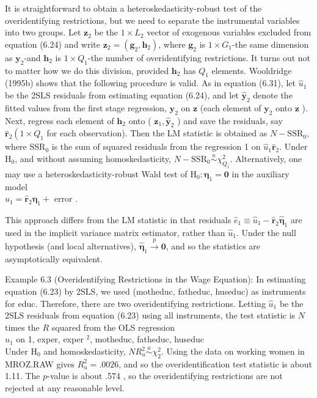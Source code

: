 \documentclass[10pt]{article}
\begin{document}
It is straightforward to obtain a heteroskedasticity-robust test of the overidentifying restrictions, but we need to separate the instrumental variables into two groups. Let $\mathbf{z}_{2}$ be the $1 \times L_{2}$ vector of exogenous variables excluded from equation (6.24) and write $\mathbf{z}_{2}=\left(\mathbf{g}_{2}, \mathbf{h}_{2}\right)$, where $\mathbf{g}_{2}$ is $1 \times G_{1}$-the same dimension as $\mathbf{y}_{2}$-and $\mathbf{h}_{2}$ is $1 \times Q_{1}$-the number of overidentifying restrictions. It turns out not to matter how we do this division, provided $\mathbf{h}_{2}$ has $Q_{1}$ elements. Wooldridge (1995b) shows that the following procedure is valid. As in equation (6.31), let $\hat{u}_{1}$ be the 2SLS residuals from estimating equation (6.24), and let $\hat{\mathbf{y}}_{2}$ denote the fitted values from the first stage regression, $\mathbf{y}_{2}$ on $\mathbf{z}$ (each element of $\mathbf{y}_{2}$ onto $\mathbf{z}$ ). Next, regress each element of $\mathbf{h}_{2}$ onto ( $\mathbf{z}_{1}, \hat{\mathbf{y}}_{2}$ ) and save the residuals, say $\hat{\mathbf{r}}_{2}\left(1 \times Q_{1}\right.$ for each observation). Then the LM statistic is obtained as $N-\mathrm{SSR}_{0}$, where $\mathrm{SSR}_{0}$ is the sum of squared residuals from the regression 1 on $\hat{u}_{1} \hat{\mathbf{r}}_{2}$. Under $\mathrm{H}_{0}$, and without assuming homoskedasticity, $N-\mathrm{SSR}_{0} \stackrel{a}{\sim} \chi_{Q_{1}}^{2}$. Alternatively, one may use a heteroskedasticity-robust Wald test of $\mathrm{H}_{0}: \boldsymbol{\eta}_{1}=\mathbf{0}$ in the auxiliary model\\
$\hat{u}_{1}=\hat{\mathbf{r}}_{2} \boldsymbol{\eta}_{1}+$ error .

This approach differs from the LM statistic in that residuals $\hat{e}_{1} \equiv \hat{u}_{1}-\hat{\mathbf{r}}_{2} \hat{\boldsymbol{\eta}}_{1}$ are used in the implicit variance matrix estimator, rather than $\hat{u}_{1}$. Under the null hypothesis (and local alternatives), $\hat{\boldsymbol{\eta}}_{1} \xrightarrow{p} \mathbf{0}$, and so the statistics are asymptotically equivalent.

Example 6.3 (Overidentifying Restrictions in the Wage Equation): In estimating equation (6.23) by 2SLS, we used (motheduc, fatheduc, huseduc) as instruments for educ. Therefore, there are two overidentifying restrictions. Letting $\hat{u}_{1}$ be the 2SLS residuals from equation (6.23) using all instruments, the test statistic is $N$ times the $R$ squared from the OLS regression\\
$\hat{u}_{1}$ on 1, exper, exper ${ }^{2}$, motheduc, fatheduc, huseduc\\
Under $\mathrm{H}_{0}$ and homoskedasticity, $N R_{u}^{2} \stackrel{a}{\sim} \chi_{2}^{2}$. Using the data on working women in MROZ.RAW gives $R_{u}^{2}=.0026$, and so the overidentification test statistic is about\\
1.11. The $p$-value is about .574 , so the overidentifying restrictions are not rejected at any reasonable level.
\end{document}
